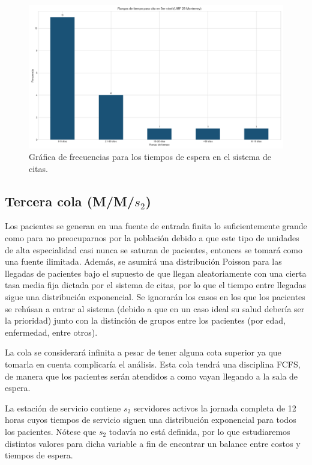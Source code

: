 \documentclass[10pt]{article}
\begin{document}
    \begin{figure}[h]
    	\centering
    	\includegraphics[width=\linewidth]{./images/rangos-tiempo-3-umf28.png}
    	\caption{Gráfica de frecuencias para los tiempos de espera en el sistema de citas.}
    	\label{fig:frec_espera_cita}
    \end{figure}
    
    \subsection{Tercera cola (M/M/$s_{2}$)}
    Los pacientes se generan en una fuente de entrada finita lo suficientemente grande como para no preocuparnos por la población debido a que este tipo de unidades de alta especialidad casi nunca se saturan de pacientes, entonces se tomará como una fuente ilimitada. Además, se asumirá una distribución Poisson para las llegadas de pacientes bajo el supuesto de que llegan aleatoriamente con una cierta tasa media fija dictada por el sistema de citas, por lo que el tiempo entre llegadas sigue una distribución exponencial. Se ignorarán los casos en los que los pacientes se rehúsan a entrar al sistema (debido a que en un caso ideal su salud debería ser la prioridad) junto con la distinción de grupos entre los pacientes (por edad, enfermedad, entre otros).
    
    La cola se considerará infinita a pesar de tener alguna cota superior ya que tomarla en cuenta complicaría el análisis. Esta cola tendrá una disciplina FCFS, de manera que los pacientes serán atendidos a como vayan llegando a la sala de espera.
    
    La estación de servicio contiene $s_{2}$ servidores activos la jornada completa de 12 horas cuyos tiempos de servicio siguen una distribución exponencial para todos los pacientes. Nótese que $s_{2}$ todavía no está definida, por lo que estudiaremos distintos valores para dicha variable a fin de encontrar un balance entre costos y tiempos de espera.
    
\end{document}
